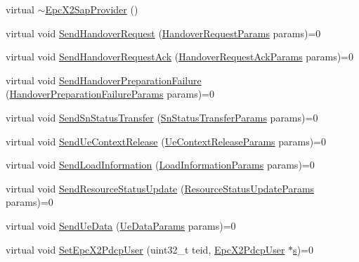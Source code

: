 \begin{DoxyCompactItemize}
\item 
virtual \hyperlink{classns3_1_1EpcX2SapProvider_ad4526e476e5c1c9a252f24df2c74903a}{$\sim$\+Epc\+X2\+Sap\+Provider} ()
\item 
virtual void \hyperlink{classns3_1_1EpcX2SapProvider_a5cb67a4bbe2e28034d22d09d356cba41}{Send\+Handover\+Request} (\hyperlink{structns3_1_1EpcX2Sap_1_1HandoverRequestParams}{Handover\+Request\+Params} params)=0
\item 
virtual void \hyperlink{classns3_1_1EpcX2SapProvider_a1675338e78f6d98636db777a3b771f60}{Send\+Handover\+Request\+Ack} (\hyperlink{structns3_1_1EpcX2Sap_1_1HandoverRequestAckParams}{Handover\+Request\+Ack\+Params} params)=0
\item 
virtual void \hyperlink{classns3_1_1EpcX2SapProvider_ab88e7c840efe967b8a7514d357991e2b}{Send\+Handover\+Preparation\+Failure} (\hyperlink{structns3_1_1EpcX2Sap_1_1HandoverPreparationFailureParams}{Handover\+Preparation\+Failure\+Params} params)=0
\item 
virtual void \hyperlink{classns3_1_1EpcX2SapProvider_ab4316660cf0d82917e62ec110bc67872}{Send\+Sn\+Status\+Transfer} (\hyperlink{structns3_1_1EpcX2Sap_1_1SnStatusTransferParams}{Sn\+Status\+Transfer\+Params} params)=0
\item 
virtual void \hyperlink{classns3_1_1EpcX2SapProvider_ac8152206103c6b4019019507a46680fe}{Send\+Ue\+Context\+Release} (\hyperlink{structns3_1_1EpcX2Sap_1_1UeContextReleaseParams}{Ue\+Context\+Release\+Params} params)=0
\item 
virtual void \hyperlink{classns3_1_1EpcX2SapProvider_aedda6bbbe51962e7bfab888fcc716001}{Send\+Load\+Information} (\hyperlink{structns3_1_1EpcX2Sap_1_1LoadInformationParams}{Load\+Information\+Params} params)=0
\item 
virtual void \hyperlink{classns3_1_1EpcX2SapProvider_a8c98d7449c5030717ebb24a6bb65e051}{Send\+Resource\+Status\+Update} (\hyperlink{structns3_1_1EpcX2Sap_1_1ResourceStatusUpdateParams}{Resource\+Status\+Update\+Params} params)=0
\item 
virtual void \hyperlink{classns3_1_1EpcX2SapProvider_affaa9bb37178b6061d5cd68617aaeaa4}{Send\+Ue\+Data} (\hyperlink{structns3_1_1EpcX2Sap_1_1UeDataParams}{Ue\+Data\+Params} params)=0
\item 
virtual void \hyperlink{classns3_1_1EpcX2SapProvider_a8d206a31fae16c6692197270f5dc54e5}{Set\+Epc\+X2\+Pdcp\+User} (uint32\+\_\+t teid, \hyperlink{classns3_1_1EpcX2PdcpUser}{Epc\+X2\+Pdcp\+User} $\ast$\hyperlink{generate__test__data__lte__sinr_8m_ad83eeb3a142285d1243a08c6b7026df8}{s})=0

\end{DoxyCompactItemize}
